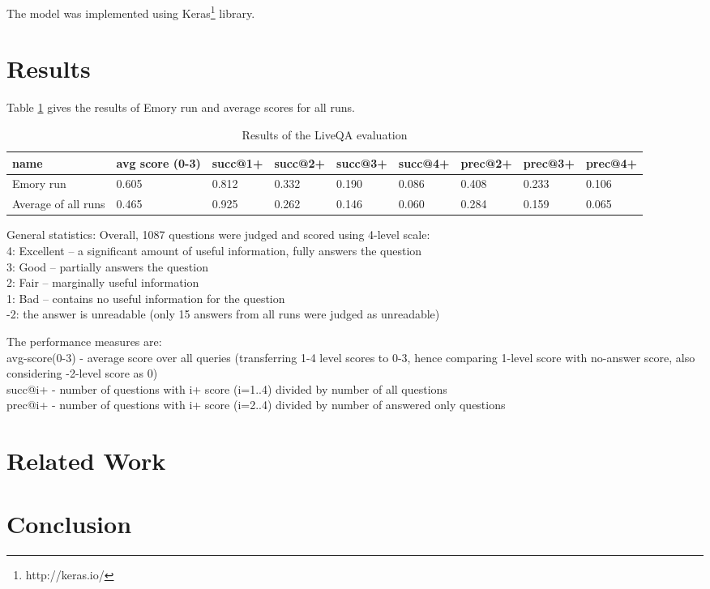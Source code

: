 \documentclass[]{article}
\begin{document}
The model was implemented using Keras\footnote{http://keras.io/} library.

\section{Results}

Table \ref{table:liveqa-results} gives the results of Emory run and average scores for all runs.

\begin{table}
\caption{Results of the LiveQA evaluation}
\label{table:liveqa-results}
\begin{tabular}{|p{1.2cm}|p{1.2cm}|p{1.2cm}|p{1.2cm}|p{1.2cm}|p{1.2cm}|p{1.2cm}|p{1.2cm}|p{1.2cm}|}
\hline
name & avg score (0-3) & succ@1+ & succ@2+ & succ@3+ & succ@4+ & prec@2+ &
 prec@3+ & prec@4+ \\
 \hline
Emory run & 0.605 & 0.812 & 0.332 & 0.190 & 0.086 & 0.408 & 0.233 & 0.106\\
\hline
Average of all runs & 0.465 & 0.925 & 0.262 & 0.146 & 0.060 & 0.284 & 0.159 & 0.065\\
\hline
\end{tabular}
\end{table}

General statistics:
Overall, 1087 questions were judged and scored using 4-level scale:\\
4: Excellent -- a significant amount of useful information, fully answers the question\\
3: Good – partially answers the question\\
2: Fair -- marginally useful information\\
1: Bad – contains no useful information for the question\\
-2: the answer is unreadable  (only 15 answers from all runs were judged as unreadable)

The performance measures are:\\
avg-score(0-3) - average score over all queries (transferring 1-4 level scores to 0-3, hence comparing 1-level score with no-answer score, also considering -2-level score as 0)\\
succ@i+ - number of questions with i+ score (i=1..4) divided by number of all questions\\
prec@i+ - number of questions with i+ score (i=2..4) divided by number of answered only questions\\

\section{Related Work}

\section{Conclusion}


\end{document}
